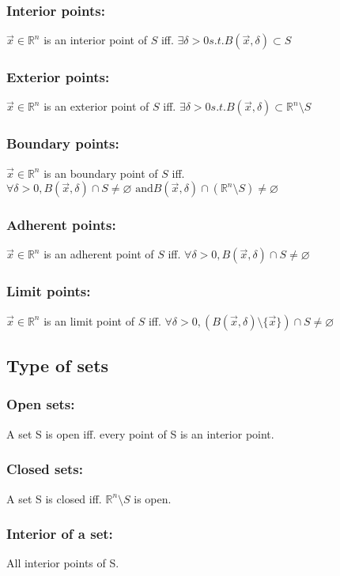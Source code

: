 \documentclass[11pt, a4paper]{article}
\begin{document}
            \subsubsection{Interior points:} $\vec{x} \in \mathbb{R}^n$ is an interior point of $S$ iff. $\exists \delta > 0 s.t. B(\vec{x}, \delta) \subset S$
            \subsubsection{Exterior points:} $\vec{x} \in \mathbb{R}^n$ is an exterior point of $S$ iff. $\exists \delta > 0 s.t. B(\vec{x}, \delta) \subset \mathbb{R}^n \setminus S$
            \subsubsection{Boundary points:} $\vec{x} \in \mathbb{R}^n$ is an boundary point of $S$ iff. $\forall \delta > 0, B(\vec{x}, \delta) \cap S \neq \varnothing \text{ and} B(\vec{x}, \delta) \cap (\mathbb{R}^n \setminus S) \neq \varnothing$
            \subsubsection{Adherent points:} $\vec{x} \in \mathbb{R}^n$ is an adherent point of $S$ iff. $\forall \delta > 0, B(\vec{x}, \delta) \cap S \neq \varnothing$
            \subsubsection{Limit points:} $\vec{x} \in \mathbb{R}^n$ is an limit point of $S$ iff. $\forall \delta > 0, (B(\vec{x}, \delta) \setminus \{\vec{x}\}) \cap S \neq \varnothing$
        \subsection{Type of sets}
        \subsubsection{Open sets:} A set S is open iff. every point of S is an interior point.
        \subsubsection{Closed sets:} A set S is closed iff. $\mathbb{R}^n \setminus S$ is open.
        \subsubsection{Interior of a set:} All interior points of S.
\end{document}
